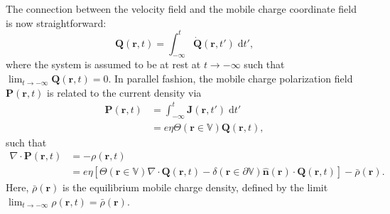 \documentclass{article}
\begin{document}

The connection between the velocity field and the mobile charge coordinate field is now straightforward:
\begin{equation}
\mathbf{Q}(\mathbf{r},t) = \int_{-\infty}^t\dot{\mathbf{Q}}(\mathbf{r},t')\;\mathrm{d}t',
\end{equation}
where the system is assumed to be at rest at $t\to-\infty$ such that $\lim_{t\to-\infty}\mathbf{Q}(\mathbf{r},t) = 0$. In parallel fashion, the mobile charge polarization field $\mathbf{P}(\mathbf{r},t)$ is related to the current density via
\begin{equation}
\begin{split}
\mathbf{P}(\mathbf{r},t) &= \int_{-\infty}^t\mathbf{J}(\mathbf{r},t')\;\mathrm{d}t'\\
&= e\eta\Theta(\mathbf{r}\in\mathbb{V})\mathbf{Q}(\mathbf{r},t),
\end{split}
\end{equation}
such that
\begin{equation}
\begin{split}
\nabla\cdot\mathbf{P}(\mathbf{r},t) 
&= -\rho(\mathbf{r},t)\\
&= e\eta\left[\Theta(\mathbf{r}\in\mathbb{V})\nabla\cdot\mathbf{Q}(\mathbf{r},t) - \delta(\mathbf{r}\in\partial\mathbb{V})\hat{\mathbf{n}}(\mathbf{r})\cdot\mathbf{Q}(\mathbf{r},t)\right] - \bar{\rho}(\mathbf{r}).
\end{split}
\end{equation}
Here, $\bar{\rho}(\mathbf{r})$ is the equilibrium mobile charge density, defined by the limit $\lim_{t\to-\infty}\rho(\mathbf{r},t) = \bar{\rho}(\mathbf{r})$.

\end{document}
